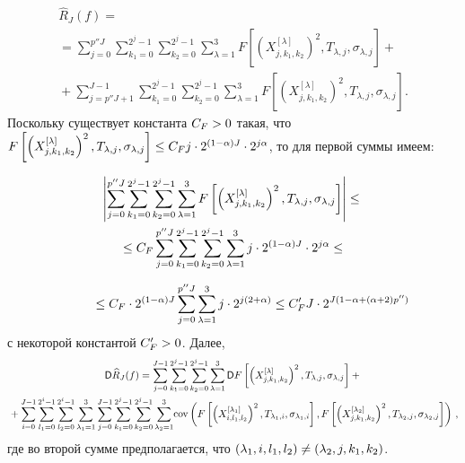 \begin{multicols}{2}
\noindent
\begin{multline*}
\widehat{R}_J (f) ={}\\
{}= \sum\limits_{j=0}^{p''J} \sum\limits_{k_1=0}^{2^j-1}
\sum\limits_{k_2=0}^{2^j-1}
\sum\limits_{\lambda=1}^3 F\left[\left(X_{j,k_1,k_2}^{[\lambda]}\right)^2,T_{\lambda,j},
\sigma_{\lambda,j}\right] +{}\\
{}+
 \sum\limits_{j=p''J+1}^{J-1} \sum\limits_{k_1=0}^{2^j-1}
 \sum\limits_{k_2=0}^{2^j-1} \sum\limits_{\lambda=1}^3
 F\left[\left(X_{j,k_1,k_2}^{[\lambda]}\right)^2,T_{\lambda,j},\sigma_{\lambda,j}\right].
\end{multline*}
%
Поскольку существует константа $C_F \hm> 0$ такая, что
$F\left[\left(X_{j,k_1,k_2}^{[\lambda]}\right)^2,T_{\lambda,j},\sigma_{\lambda,j}\right] \hm
\leq C_F  j \cdot2^{(1-\alpha)J}\cdot2^{j\alpha}$, то для первой суммы имеем:

\noindent
\begin{multline*}
\left\vert\sum_{j=0}^{p''J} \sum_{k_1=0}^{2^j-1}\sum_{k_2=0}^{2^j-1}
\sum_{\lambda=1}^3 F\left[\left(X_{j,k_1,k_2}^{[\lambda]}\right)^2,T_{\lambda,j},
\sigma_{\lambda,j}\right]\right\vert
\leq {}\\
{}\leq C_F\sum_{j=0}^{p''J}
\sum_{k_1=0}^{2^j-1}
\sum_{k_2=0}^{2^j-1}
\sum_{\lambda=1}^3 j \cdot2^{(1-\alpha)J}\cdot2^{j\alpha} \leq{}
\end{multline*}

\end{multicols}



\noindent
\begin{equation}
\label{Large_Coeff_Order}
\hspace*{10mm}{}\leq C_F\cdot 2^{(1-\alpha)J}
\sum_{j=0}^{p''J}
\sum_{\lambda=1}^3 j\cdot 2^{j(2+\alpha)}
\leq C'_F  J\cdot 2^{J(1 - \alpha + (\alpha + 2) p'')}
\end{equation}
с некоторой константой $C'_F\hm > 0$. Далее,
\begin{multline}                                                                        \label{Var_Struct}
{\sf D} \widehat{R}_J(f)
= \sum\limits_{j = 0}^{J - 1} \sum\limits_{k_1 = 0}^{2^j - 1}
\sum\limits_{k_2 = 0}^{2^j - 1} \sum\limits_{\lambda=1}^3
{\sf D} F\left[\left(X_{j,k_1,k_2}^{[\lambda]}\right)^2,T_{\lambda,j},\sigma_{\lambda,j}\right]+{}\\
{}+ \sum\limits_{i = 0}^{J - 1} \sum\limits_{l_1 = 0}^{2^i - 1}
\sum\limits_{l_2 = 0}^{2^i - 1} \sum\limits_{\lambda_1=1}^3
\sum\limits_{j = 0}^{J - 1}\sum\limits_{k_1 = 0}^{2^j - 1}
\sum\limits_{k_2 = 0}^{2^j - 1}\sum\limits_{\lambda_2=1}^3\!
\mathrm{cov}\left(F\left[\left(X_{i,l_1,l_2}^{[\lambda_1]}\right)^2,
T_{\lambda_1,i},
\sigma_{\lambda_1,i}\right], F\left[\left(X_{j,k_1,k_2}^{[\lambda_2]}\right)^2,
T_{\lambda_2,j},\sigma_{\lambda_2,j}\right]\right)\,,
\end{multline}
где во второй сумме предполагается, что $(\lambda_1,i,l_1,l_2)\hm\neq(\lambda_2,j,k_1,k_2)$.

